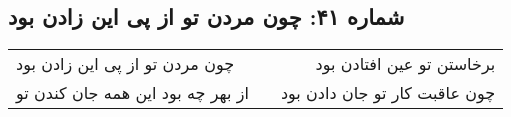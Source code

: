 \begin{center}
\section*{شماره ۴۱: چون مردن تو از پی این زادن بود}
\label{sec:041}
\begin{longtable}{l p{0.5cm} r}
چون مردن تو از پی این زادن بود
&&
برخاستن تو عین افتادن بود
\\
از بهر چه بود این همه جان کندن تو
&&
چون عاقبت کار تو جان دادن بود
\\
\end{longtable}
\end{center}
